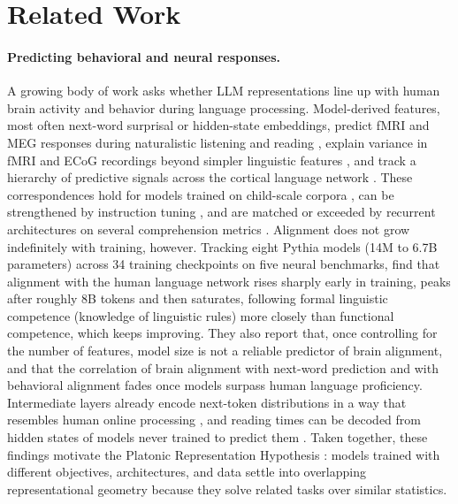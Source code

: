 \section{Related Work}
\label{sec:related}

\paragraph{Predicting behavioral and neural responses.}
A growing body of work asks whether LLM representations line up with human brain activity and behavior during language processing. Model-derived features, most often next-word surprisal or hidden-state embeddings, predict fMRI and MEG responses during naturalistic listening and reading \citep{schrimpf2021neural,caucheteux2022brains,caucheteux2023evidence}, explain variance in fMRI and ECoG recordings beyond simpler linguistic features \citep{toneva2019interpreting}, and track a hierarchy of predictive signals across the cortical language network \citep{caucheteux2023evidence}. These correspondences hold for models trained on child-scale corpora \citep{hosseini2024artificial}, can be strengthened by instruction tuning \citep{aw2024instructiontuning}, and are matched or exceeded by recurrent architectures on several comprehension metrics \citep{michaelov2024revenge}. Alignment does not grow indefinitely with training, however. Tracking eight Pythia models (14M to 6.7B parameters) across 34 training checkpoints on five neural benchmarks, \citet{alkhamissi-etal-2025-language} find that alignment with the human language network rises sharply early in training, peaks after roughly 8B tokens and then saturates, following formal linguistic competence (knowledge of linguistic rules) more closely than functional competence, which keeps improving. They also report that, once controlling for the number of features, model size is not a reliable predictor of brain alignment, and that the correlation of brain alignment with next-word prediction and with behavioral alignment fades once models surpass human language proficiency. Intermediate layers already encode next-token distributions in a way that resembles human online processing \citep{kuribayashi2025humanlike}, and reading times can be decoded from hidden states of models never trained to predict them \citep{tsipidi2026probing}. Taken together, these findings motivate the Platonic Representation Hypothesis \citep{huh2024platonic}: models trained with different objectives, architectures, and data settle into overlapping representational geometry because they solve related tasks over similar statistics.

